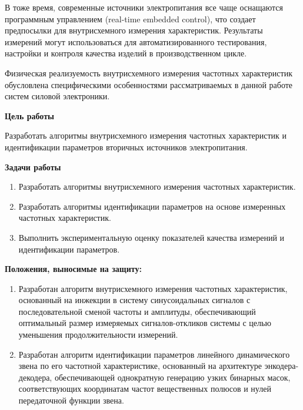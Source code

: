 \documentclass[a4paper, 14pt]{extarticle}
\begin{document}
    В тоже время, современные источники электропитания все чаще оснащаются программным управлением (real-time embedded control), что создает предпосылки для внутрисхемного измерения характеристик. Результаты измерений могут использоваться для автоматизированного тестирования, настройки и контроля качества изделий в производственном цикле.

    Физическая реализуемость внутрисхемного измерения частотных характеристик обусловлена специфическими особенностями рассматриваемых в данной работе систем силовой электроники.

    \noindent\textbf{Цель работы}\par
    Разработать алгоритмы внутрисхемного измерения частотных характеристик и идентификации параметров вторичных источников электропитания.

    \noindent\textbf{Задачи работы}\par
    \begin{enumerate}
        \item Разработать алгоритмы внутрисхемного измерения частотных характеристик.
        
        \item Разработать алгоритмы идентификации параметров на основе измеренных частотных характеристик.
        
        \item Выполнить экспериментальную оценку показателей качества измерений и идентификации параметров.
    \end{enumerate}

    \noindent\textbf{Положения, выносимые на защиту:}
    \begin{enumerate}
        \item Разработан {алгоритм внутрисхемного измерения частотных характеристик}, основанный на инжекции в систему синусоидальных сигналов с последовательной сменой частоты и амплитуды, обеспечивающий оптимальный размер измеряемых сигналов-откликов системы с целью уменьшения продолжительности измерений.

        \item Разработан {алгоритм идентификации параметров линейного динамического звена по его частотной характеристике}, основанный на архитектуре энкодера-декодера, обеспечивающей однократную генерацию узких бинарных масок, соответствующих координатам частот вещественных полюсов и нулей передаточной функции звена.
    \end{enumerate}
\end{document}

